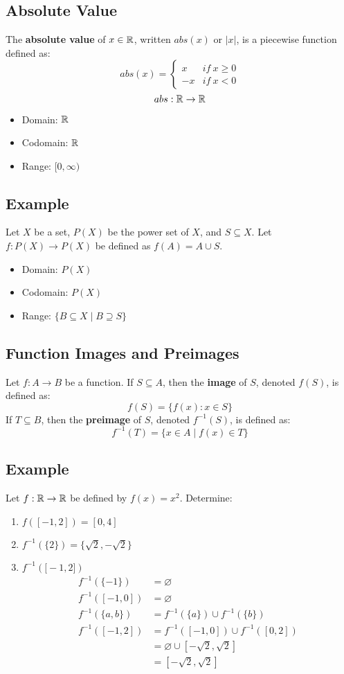 \documentclass[letterpaper, 12pt]{math}
\begin{document}
\subsection*{Absolute Value}
The \textbf{absolute value} of \( x\in\mathbb{R} \), written \( abs(x) \) or \( |x| \),
is a piecewise function defined as:
\[ abs(x) =
  \begin{cases}
    x & if\ x\geq 0 \\
    -x & if\ x < 0
  \end{cases}
\]
\[ abs:\mathbb{R}\to\mathbb{R} \]
\begin{itemize}
  \item Domain: \( \mathbb{R} \)
  \item Codomain: \( \mathbb{R} \)
  \item Range: \( [0,\infty) \)
\end{itemize}

\subsection*{Example}
Let \( X \) be a set, \( P(X) \) be the power set of \( X \), and
\( S \subseteq X \). Let \( f:P(X)\to P(X) \) be defined as
\( f(A) = A \cup S \).
\begin{itemize}
  \item Domain: \( P(X) \)
  \item Codomain: \( P(X) \)
  \item Range: \( \{B \subseteq X\mid B \supseteq S\} \)
\end{itemize}

\subsection*{Function Images and Preimages}
Let \( f:A\to B \) be a function. If \( S \subseteq A \), then the
\textbf{image} of \( S \), denoted \( f(S) \), is defined as:
\[ f(S) = \{f(x):x\in S \} \]
If \( T \subseteq B \), then the \textbf{preimage} of \( S \), denoted
\( f^{-1}(S) \), is defined as:
\[ f^{-1}(T) = \{x\in A\mid f(x)\in T\} \]

\subsection*{Example}
Let \( f:\mathbb{R}\to\mathbb{R} \) be defined by \( f(x) = x^{2} \). Determine:
\begin{enumerate}
  \item \( f([-1,2]) = [0,4] \)
  \item \( f^{-1}(\{2\})  = \{\sqrt{2},-\sqrt{2}\} \)
  \item \( f^{-1}(\big[-1,2\big]) \)
  \begin{align*}
    f^{-1}(\{-1\}) &= \varnothing \\
    f^{-1}([-1,0]) &= \varnothing \\
    f^{-1}(\{a,b\}) &= f^{-1}(\{a\}) \cup f^{-1}(\{b\}) \\
    f^{-1}([-1,2]) &= f^{-1}([-1,0]) \cup f^{-1}([0,2]) \\
    &= \varnothing \cup [-\sqrt{2},\sqrt{2}] \\
    &= [-\sqrt{2},\sqrt{2}]
  \end{align*}
\end{enumerate}
\end{document}
